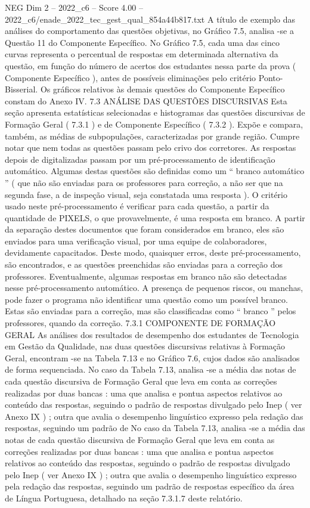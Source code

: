 \begin{textsample}{NEG Dim 2 – 2022\_c6 – Score 4.00 – 2022\_c6/enade\_2022\_tec\_gest\_qual\_854a44b817.txt}
A título de exemplo das análises do comportamento das questões objetivas, no Gráfico 7.5, analisa -se a Questão 11 do Componente Específico.
No Gráfico 7.5, cada uma das cinco curvas representa o percentual de respostas em determinada alternativa da questão, em função do número de acertos dos estudantes nessa parte da prova ( Componente Específico ), antes de possíveis eliminações pelo critério Ponto-Bisserial.
Os gráficos relativos às demais questões do Componente Específico constam do Anexo IV. 7.3 ANÁLISE DAS QUESTÕES DISCURSIVAS Esta seção apresenta estatísticas selecionadas e histogramas das questões discursivas de Formação Geral ( 7.3.1 ) e de Componente Específico ( 7.3.2 ).
Expõe e compara, também, as médias de subpopulações, caracterizadas por grande região.
Cumpre notar que nem todas as questões passam pelo crivo dos corretores.
As respostas depois de digitalizadas passam por um pré-processamento de identificação automático.
Algumas destas questões são definidas como um “ branco automático ” ( que não são enviadas para os professores para correção, a não ser que na segunda fase, a de inspeção visual, seja constatada uma resposta ).
O critério usado neste pré-processamento é verificar para cada questão, a partir da quantidade de PIXELS, o que provavelmente, é uma resposta em branco.
A partir da separação destes documentos que foram considerados em branco, eles são enviados para uma verificação visual, por uma equipe de colaboradores, devidamente capacitados.
Deste modo, quaisquer erros, deste pré-processamento, são encontrados, e as questões preenchidas são enviadas para a correção dos professores.
Eventualmente, algumas respostas em branco não são detectadas nesse pré-processamento automático.
A presença de pequenos riscos, ou manchas, pode fazer o programa não identificar uma questão como um possível branco.
Estas são enviadas para a correção, mas são classificadas como “ branco ” pelos professores, quando da correção. 7.3.1 COMPONENTE DE FORMAÇÃO GERAL As análises dos resultados de desempenho dos estudantes de Tecnologia em Gestão da Qualidade, nas duas questões discursivas relativas à Formação Geral, encontram -se na Tabela 7.13 e no Gráfico 7.6, cujos dados são analisados de forma sequenciada.
No caso da Tabela 7.13, analisa -se a média das notas de cada questão discursiva de Formação Geral que leva em conta as correções realizadas por duas bancas : uma que analisa e pontua aspectos relativos ao conteúdo das respostas, seguindo o padrão de respostas divulgado pelo Inep ( ver Anexo IX ) ; outra que avalia o desempenho linguístico expresso pela redação das respostas, seguindo um padrão de No caso da Tabela 7.13, analisa -se a média das notas de cada questão discursiva de Formação Geral que leva em conta as correções realizadas por duas bancas : uma que analisa e pontua aspectos relativos ao conteúdo das respostas, seguindo o padrão de respostas divulgado pelo Inep ( ver Anexo IX ) ; outra que avalia o desempenho linguístico expresso pela redação das respostas, seguindo um padrão de respostas específico da área de Língua Portuguesa, detalhado na seção 7.3.1.7 deste relatório.

\end{textsample}
